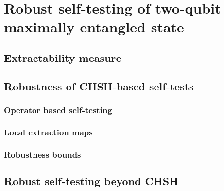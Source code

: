\chapter{Robust self-testing of two-qubit maximally entangled state}

\section{Extractability measure}

\section{Robustness of CHSH-based self-tests}

\subsection{Operator based self-testing}
\subsection{Local extraction maps}
\subsection{Robustness bounds}

\section{Robust self-testing beyond CHSH}
